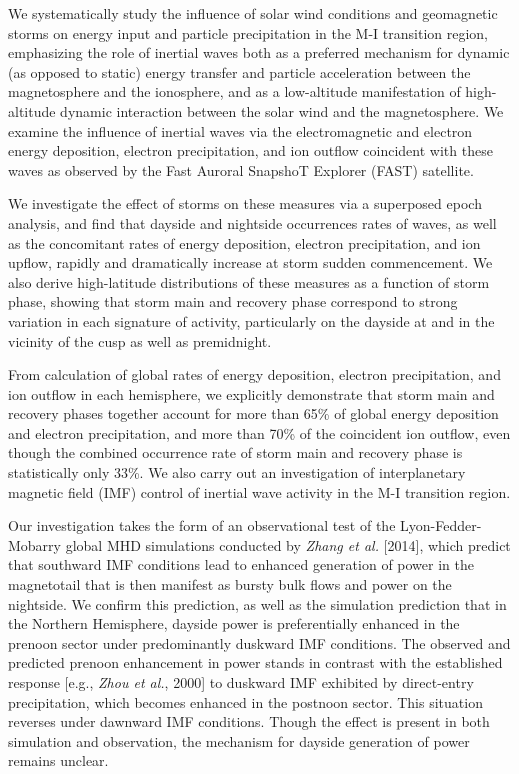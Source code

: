 We systematically study the influence of solar wind conditions and geomagnetic
storms on energy input and particle precipitation in the M-I transition region,
emphasizing the role of inertial \Alf waves both as a preferred mechanism for
dynamic (as opposed to static) energy transfer and particle acceleration between
the magnetosphere and the ionosphere, and as a low-altitude manifestation of
high-altitude dynamic interaction between the solar wind and the
magnetosphere. We examine the influence of inertial \Alf waves via the
electromagnetic and electron energy deposition, electron precipitation, and ion
outflow coincident with these waves as observed by the Fast Auroral SnapshoT
Explorer (FAST) satellite.  

We investigate the effect of storms on these measures via a superposed epoch
analysis, and find that dayside and nightside occurrences rates of \Alf waves,
as well as the concomitant rates of energy deposition, electron precipitation,
and ion upflow, rapidly and dramatically increase at storm sudden
commencement. We also derive high-latitude distributions of these measures as a
function of storm phase, showing that storm main and recovery phase correspond
to strong variation in each signature of \Alfic activity, particularly on the
dayside at and in the vicinity of the cusp as well as premidnight.  

From calculation of global rates of \Alfic energy deposition, electron
precipitation, and ion outflow in each hemisphere, we explicitly demonstrate
that storm main and recovery phases together account for more than 65\% of
global \Alfic energy deposition and electron precipitation, and more than 70\%
of the coincident ion outflow, even though the combined occurrence rate of storm
main and recovery phase is statistically only 33\%.  We also carry out an
investigation of interplanetary magnetic field (IMF) control of inertial \Alf
wave activity in the M-I transition region.

Our investigation takes the form of an observational test of the
Lyon-Fedder-Mobarry global MHD simulations conducted by \textsl{Zhang et al.}
[2014], which predict that southward IMF conditions lead to enhanced generation
of power in the magnetotail that is then manifest as bursty bulk flows and
\Alfic power on the nightside. We confirm this prediction, as well as the
simulation prediction that in the Northern Hemisphere, dayside \Alfic power is
preferentially enhanced in the prenoon sector under predominantly duskward IMF
conditions. The observed and predicted prenoon enhancement in \Alfic power
stands in contrast with the established response [e.g., \textsl{Zhou et al.},
2000] to duskward IMF exhibited by direct-entry precipitation, which becomes
enhanced in the postnoon sector. This situation reverses under dawnward IMF
conditions. Though the effect is present in both simulation and observation, the
mechanism for dayside generation of \Alfic power remains unclear.  

